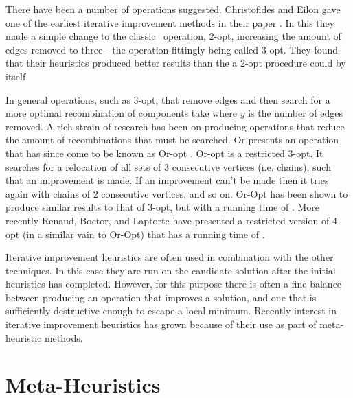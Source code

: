 % 
% 


There have been a number of operations suggested. Christofides and Eilon gave one of the earliest iterative improvement methods in their paper \cite{CE:1969}. In this they made a simple change to the classic \TSP\ operation, 2-opt, increasing the amount of edges removed to three - the operation fittingly being called 3-opt. They found that their heuristics produced better results than the a 2-opt procedure could by itself. 

In general operations, such as 3-opt, that remove edges and then search for a more optimal recombination of components take  where $y$ is the number of edges removed. A rich strain of research has been on producing operations that reduce the amount of recombinations that must be searched. Or presents an operation that has since come to be known as Or-opt \cite{Or:1976}. Or-opt is a restricted 3-opt. It searches for a relocation of all sets of 3 consecutive vertices (i.e. chains), such that an improvement is made. If an improvement can't be made then it tries again with chains of 2 consecutive vertices, and so on. Or-Opt has been shown to produce similar results to that of 3-opt, but with a running time of . More recently Renaud, Boctor, and Laptorte have presented a restricted version of 4-opt (in a similar vain to Or-Opt) that has a running time of  \cite{RBL:1996}. 

Iterative improvement heuristics are often used in combination with the other techniques. In this case they are run on the candidate solution after the initial heuristics has completed. However, for this purpose there is often a fine balance between producing an operation that improves a solution, and one that is sufficiently destructive enough to escape a local minimum.  Recently interest in iterative improvement heuristics has grown because of their use as part of meta-heuristic methods. 

\section{Meta-Heuristics}


